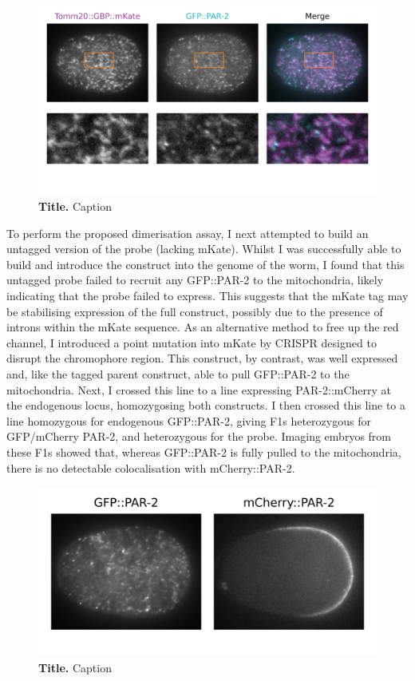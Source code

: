 \documentclass[12pt]{"article"}
\newcommand{\mycaption}[2]{\caption[#1]{\textbf{#1.} #2}}
\begin{document}
\begin{figure}[!h]
\includegraphics[scale=0.95]{tomm20_merge}
\setlength{\abovecaptionskip}{20pt}
\centering
\mycaption{Title}{Caption}
\end{figure}

To perform the proposed dimerisation assay, I next attempted to build an untagged version of the probe (lacking mKate). Whilst I was successfully able to build and introduce the construct into the genome of the worm, I found that this untagged probe failed to recruit any GFP::PAR-2 to the mitochondria, likely indicating that the probe failed to express. This suggests that the mKate tag may be stabilising expression of the full construct, possibly due to the presence of introns within the mKate sequence. As an alternative method to free up the red channel, I introduced a point mutation into mKate by CRISPR designed to disrupt the chromophore region. This construct, by contrast, was well expressed and, like the tagged parent construct, able to pull GFP::PAR-2 to the mitochondria. Next, I crossed this line to a line expressing PAR-2::mCherry at the endogenous locus, homozygosing both constructs. I then crossed this line to a line homozygous for endogenous GFP::PAR-2, giving F1s heterozygous for GFP/mCherry PAR-2, and heterozygous for the probe.  Imaging embryos from these F1s showed that, whereas GFP::PAR-2 is fully pulled to the mitochondria, there is no detectable colocalisation with mCherry::PAR-2.\\

\begin{figure}[!h]
\includegraphics[scale=1]{tomm20_assay}
\setlength{\abovecaptionskip}{20pt}
\centering
\mycaption{Title}{Caption}
\end{figure}
\end{document}
